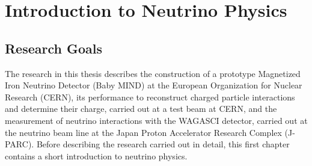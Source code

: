 \chapter{Introduction to Neutrino Physics}
\label{c:theoryIntro}

\section{Research Goals}
The research in this thesis describes the construction of a prototype Magnetized Iron Neutrino Detector (Baby MIND) at the European Organization for Nuclear Research (CERN), its performance to reconstruct charged particle interactions and determine their charge, carried out at a test beam at CERN, and the measurement of neutrino interactions with the WAGASCI detector, carried out at the neutrino beam line at the Japan Proton Accelerator Research Complex (J-PARC). Before describing the research carried out in detail, this first chapter contains a short introduction to neutrino physics.



